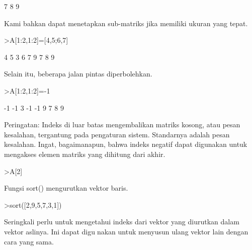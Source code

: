 \documentclass[a4paper,10pt]{article}
\begin{document}
\begin{eulernotebook}
\begin{eulercomment}
\begin{eulercomment}
\begin{eulercomment}
\begin{eulercomment}
\begin{euleroutput}
              7             8             9 
\end{euleroutput}
\begin{eulercomment}
Kami bahkan dapat menetapkan sub-matriks jika memiliki ukuran yang
tepat.
\end{eulercomment}
\begin{eulerprompt}
>A[1:2,1:2]=[4,5;6,7]
\end{eulerprompt}
\begin{euleroutput}
              4             5             3 
              6             7             9 
              7             8             9 
\end{euleroutput}
\begin{eulercomment}
Selain itu, beberapa jalan pintas diperbolehkan.
\end{eulercomment}
\begin{eulerprompt}
>A[1:2,1:2]=-1
\end{eulerprompt}
\begin{euleroutput}
             -1            -1             3 
             -1            -1             9 
              7             8             9 
\end{euleroutput}
\begin{eulercomment}
Peringatan: Indeks di luar batas mengembalikan matriks kosong, atau
pesan kesalahan, tergantung pada pengaturan sistem. Standarnya adalah
pesan kesalahan. Ingat, bagaimanapun, bahwa indeks negatif dapat
digunakan untuk mengakses elemen matriks yang dihitung dari akhir.
\end{eulercomment}
\begin{eulerprompt}
>A[2]
\end{eulerprompt}
\begin{euleroutput}
  [-1,  -1,  9]
\end{euleroutput}
\begin{eulercomment}
Fungsi sort() mengurutkan vektor baris.
\end{eulercomment}
\begin{eulerprompt}
>sort([2,9,5,7,3,1])
\end{eulerprompt}
\begin{euleroutput}
  [1,  2,  3,  5,  7,  9]
\end{euleroutput}
\begin{eulercomment}
Seringkali perlu untuk mengetahui indeks dari vektor yang diurutkan
dalam vektor aslinya. Ini dapat digunakan untuk menyusun ulang vektor
lain dengan cara yang sama.\\

\end{eulercomment}
\end{eulercomment}
\end{eulercomment}
\end{eulercomment}
\end{eulercomment}
\end{eulernotebook}
\end{document}
